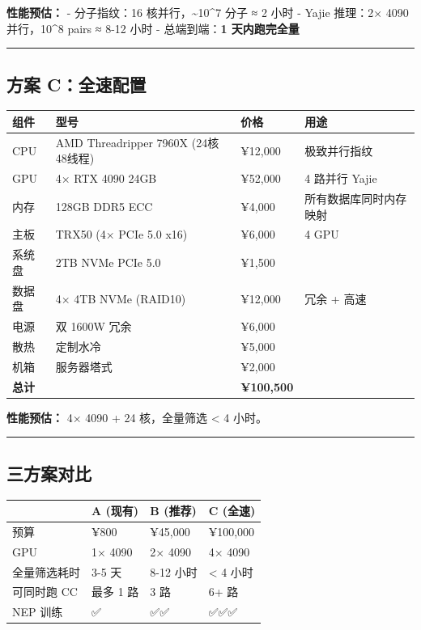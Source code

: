 \documentclass[
  12pt,
]{ctexart}
\begin{document}
\textbf{性能预估：} - 分子指纹：16 核并行，\textasciitilde10\^{}7 分子 ≈
2 小时 - Yajie 推理：2× 4090 并行，10\^{}8 pairs ≈ 8-12 小时 -
总端到端：\textbf{1 天内跑完全量}

\begin{center}\rule{0.5\linewidth}{0.5pt}\end{center}

\subsection{方案
C：全速配置}\label{ux65b9ux6848-cux5168ux901fux914dux7f6e}

\begin{longtable}[]{@{}llll@{}}
\toprule\noalign{}
组件 & 型号 & 价格 & 用途 \\
\midrule\noalign{}
\endhead
\bottomrule\noalign{}
\endlastfoot
CPU & AMD Threadripper 7960X (24核48线程) & ¥12,000 & 极致并行指纹 \\
GPU & 4× RTX 4090 24GB & ¥52,000 & 4 路并行 Yajie \\
内存 & 128GB DDR5 ECC & ¥4,000 & 所有数据库同时内存映射 \\
主板 & TRX50 (4× PCIe 5.0 x16) & ¥6,000 & 4 GPU \\
系统盘 & 2TB NVMe PCIe 5.0 & ¥1,500 & \\
数据盘 & 4× 4TB NVMe (RAID10) & ¥12,000 & 冗余 + 高速 \\
电源 & 双 1600W 冗余 & ¥6,000 & \\
散热 & 定制水冷 & ¥5,000 & \\
机箱 & 服务器塔式 & ¥2,000 & \\
\textbf{总计} & & \textbf{¥100,500} & \\
\end{longtable}

\textbf{性能预估：} 4× 4090 + 24 核，全量筛选 \textless{} 4 小时。

\begin{center}\rule{0.5\linewidth}{0.5pt}\end{center}

\subsection{三方案对比}\label{ux4e09ux65b9ux6848ux5bf9ux6bd4}

\begin{longtable}[]{@{}llll@{}}
\toprule\noalign{}
& A (现有) & B (推荐) & C (全速) \\
\midrule\noalign{}
\endhead
\bottomrule\noalign{}
\endlastfoot
预算 & ¥800 & ¥45,000 & ¥100,000 \\
GPU & 1× 4090 & 2× 4090 & 4× 4090 \\
全量筛选耗时 & 3-5 天 & 8-12 小时 & \textless{} 4 小时 \\
可同时跑 CC & 最多 1 路 & 3 路 & 6+ 路 \\
NEP 训练 & ✅ & ✅✅ & ✅✅✅ \\
\end{longtable}
\end{document}
